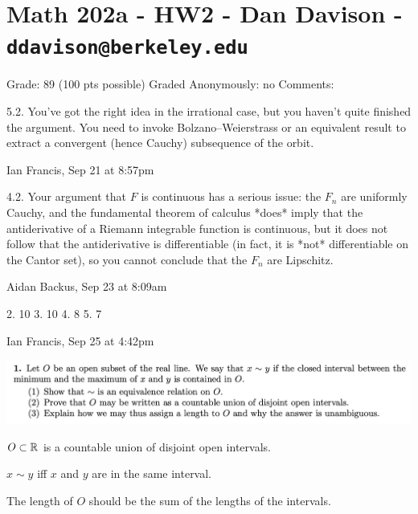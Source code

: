 \section*{Math 202a - HW2 - Dan Davison - \texttt{ddavison@berkeley.edu}}

Grade: 89 (100 pts possible)
Graded Anonymously: no
Comments:

5.2. You've got the right idea in the irrational case, but you haven't quite finished the argument. You need to
invoke Bolzano–Weierstrass or an equivalent result to extract a convergent (hence Cauchy) subsequence of the
orbit.

Ian Francis, Sep 21 at 8:57pm

4.2. Your argument that $F$ is continuous has a serious issue: the $F_n$ are uniformly Cauchy, and the
fundamental theorem of calculus *does* imply that the antiderivative of a Riemann integrable function is
continuous, but it does not follow that the antiderivative is differentiable (in fact, it is *not*
differentiable on the Cantor set), so you cannot conclude that the $F_n$ are Lipschitz.

Aidan Backus, Sep 23 at 8:09am

2. 10 3. 10 4. 8 5. 7

Ian Francis, Sep 25 at 4:42pm

\begin{mdframed}
  \includegraphics[width=400pt]{img/analysis--berkeley-202a-ebe4.png}
\end{mdframed}

\begin{intuition*}
  $O \subset \mathbb{R}$ is a countable union of disjoint open intervals.

  $x \sim y$ iff $x$ and $y$ are in the same interval.

  The length of $O$ should be the sum of the lengths of the intervals.
\end{intuition*}


